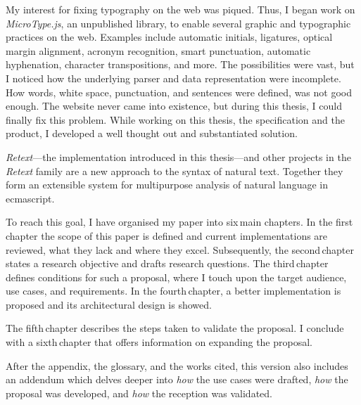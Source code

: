 My interest for fixing typography on the web was piqued.
Thus, I began work on \emph{MicroType.js}, an unpublished library, to
  enable several graphic and typographic practices on the web.
Examples include automatic initials, ligatures, optical margin alignment,
  acronym recognition, smart punctuation, automatic hyphenation, character
  transpositions, and more.
The possibilities were vast, but I noticed how the underlying parser and data
  representation were incomplete.
How words, white space, punctuation, and sentences were defined, was not
  good enough.
The website never came into existence, but during this thesis, I could
  finally fix this problem.
While working on this thesis, the specification and the product, I developed
  a well thought out and substantiated solution.

\emph{Retext}---the implementation introduced in this thesis---and other
  projects in the \emph{Retext} family are a new approach to the syntax of
  natural text.
Together they form an extensible system for multipurpose analysis of natural
  language in \gls{ecmascript}.

To reach this goal, I have organised my paper into six\,main chapters.
In the first\,chapter the scope of this paper is defined and current
  implementations are reviewed, what they lack and where they excel.
Subsequently, the second\,chapter states a research objective and drafts
  research questions.
The third\,chapter defines conditions for such a proposal, where I touch
  upon the target audience, use cases, and requirements.
In the fourth\,chapter, a better implementation is proposed and its
  architectural design is showed.

The fifth\,chapter describes the steps taken to validate the proposal.
I conclude with a sixth\,chapter that offers information on expanding the
  proposal.

After the appendix, the glossary, and the works cited, this version also
  includes an addendum which delves deeper into \emph{how} the use cases were
  drafted, \emph{how} the proposal was developed, and \emph{how} the
  reception was validated.

\endgroup
